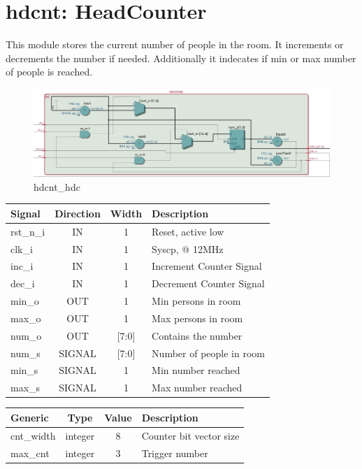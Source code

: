 \documentclass[12pt,a4 paper] {report}
\begin{document}
\newpage

\section{hdcnt: HeadCounter}
This module stores the current number of people in the room. It increments or decrements the number if needed. 
Additionally it indecates if min or max number of people is reached.
\begin{figure}[h]
	\centering	
	\includegraphics[scale=0.3]{../png/hdcnt_hdc.png}
	\caption{hdcnt\_hdc}
\end{figure}
\begin{center}
	\begin{tabular}{ | p{2cm} | c | c | p{5cm} |}
		\hline
		\textbf{Signal} & \textbf{Direction} & \textbf{Width} & \textbf{Description} \\
		\hline
		\hline
		rst\_n\_i & IN & 1 & Reset, active low \\
		\hline
		clk\_i & IN & 1 & Syscp, @ 12MHz \\
		\hline
		inc\_i & IN & 1 & Increment Counter Signal \\
		\hline
		dec\_i & IN & 1 & Decrement Counter Signal \\
		\hline
		min\_o & OUT & 1 & Min persons in room \\
		\hline
		max\_o & OUT & 1 & Max persons in room \\
		\hline
		num\_o & OUT & [7:0] & Contains the number \\
		\hline
		\hline
		num\_s & SIGNAL & [7:0] & Number of people in room \\
		\hline
		min\_s & SIGNAL & 1 & Min number reached \\
		\hline
		max\_s & SIGNAL & 1 & Max number reached \\
		\hline
	\end{tabular}
\end{center}
\begin{center}
	\begin{tabular}{| p{2cm} | c | c | p{5cm} |}
		\hline
		\textbf{Generic} & \textbf{Type} & \textbf{Value} & \textbf{Description} \\
		\hline
		cnt\_width & integer & 8 & Counter bit vector size \\
		\hline
		max\_cnt & integer & 3 & Trigger number \\
		\hline
	\end{tabular}	
\end{center}
\end{document}
